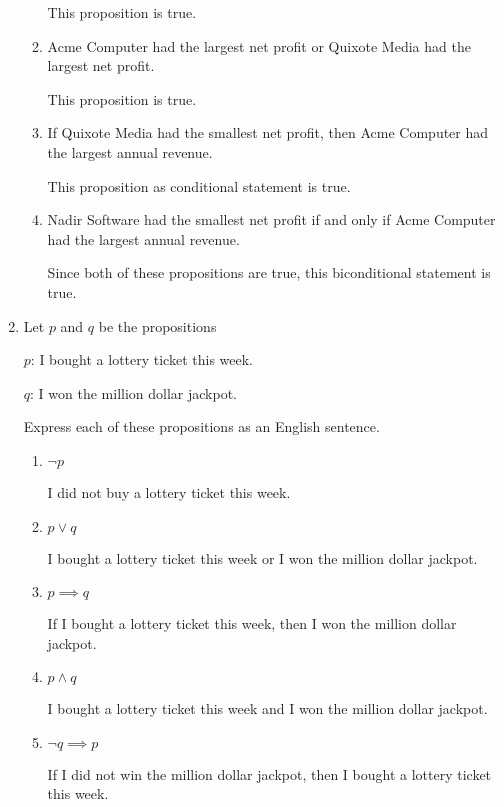 \documentclass[11pt]{article}
\begin{document}
\begin{enumerate}[label=\textbf{\arabic*.}]
\begin{enumerate}[label=\textbf{\alph*)}]
		This proposition is true.
		
		\item Acme Computer had the largest net profit or Quixote Media had the largest net profit.
		
		This proposition is true.
		
		\item If Quixote Media had the smallest net profit, then Acme Computer had the largest annual revenue.
		
		This proposition as conditional statement is true.
		
		\item Nadir Software had the smallest net profit if and only if Acme Computer had the largest annual revenue.
		
		Since both of these propositions are true, this biconditional statement is true.
	\end{enumerate}

	\item Let $p$ and $q$ be the propositions
	
	\hspace{1cm}$p$: I bought a lottery ticket this week.
	
	\hspace{1cm}$q$: I won the million dollar jackpot.
	
	Express each of these propositions as an English sentence.
	\begin{enumerate}[label=\textbf{\alph*)}]
		\item $\neg p$
		
		I did not buy a lottery ticket this week.
		
		\item $p \lor q$
		
		I bought a lottery ticket this week or I won the million dollar jackpot.
		
		\item $p \implies q$
		
		If I bought a lottery ticket this week, then I won the million dollar jackpot.
		
		\item $p \land q$
		
		I bought a lottery ticket this week and I won the million dollar jackpot.
		
		\item $\neg q \implies p$
		
		If I did not win the million dollar jackpot, then I bought a lottery ticket this week.
		

\end{enumerate}
\end{enumerate}
\end{document}
